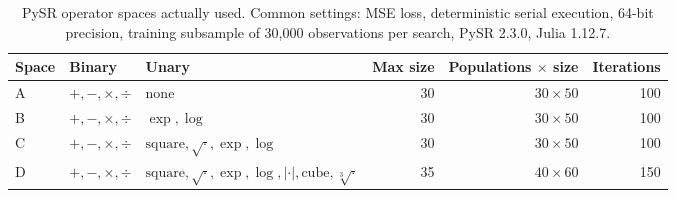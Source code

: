 \begin{table}[htbp]
\centering
\caption{PySR operator spaces actually used. Common settings: MSE loss, deterministic serial execution, 64-bit precision, training subsample of 30{,}000 observations per search, PySR 2.3.0, Julia 1.12.7.}
\label{tab:pysr}
\small
\begin{tabular}{llp{4.8cm}rrr}
\toprule
Space & Binary & Unary & Max size & Populations $\times$ size & Iterations \\
\midrule
A & $+,-,\times,\div$ & none & 30 & $30\times 50$ & 100 \\
B & $+,-,\times,\div$ & $\exp,\log$ & 30 & $30\times 50$ & 100 \\
C & $+,-,\times,\div$ & $\mathrm{square},\sqrt{\cdot},\exp,\log$ & 30 & $30\times 50$ & 100 \\
D & $+,-,\times,\div$ & $\mathrm{square},\sqrt{\cdot},\exp,\log,|\cdot|,\mathrm{cube},\sqrt[3]{\cdot}$ & 35 & $40\times 60$ & 150 \\
\bottomrule
\end{tabular}
\end{table}
